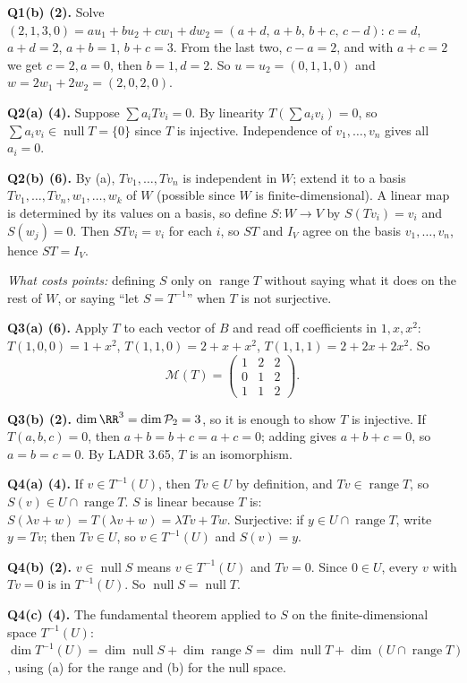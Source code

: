 \documentclass[11pt]{scrartcl}
\DeclareMathOperator{\nul}{null}
\DeclareMathOperator{\range}{range}
\newcommand{\PP}{\mathcal P}
\newcommand{\MM}{\mathcal M}
\begin{document}
\medskip\noindent\textbf{Q1(b) (2).}
Solve $(2,1,3,0)=a u_1+b u_2+c w_1+d w_2=(a+d,\,a+b,\,b+c,\,c-d)$: $c=d$, $a+d=2$, $a+b=1$, $b+c=3$. From the last two, $c-a=2$, and with $a+c=2$ we get $c=2,a=0$, then $b=1,d=2$.
So $u=u_2=(0,1,1,0)$ and $w=2w_1+2w_2=(2,0,2,0)$.

\medskip\noindent\textbf{Q2(a) (4).}
Suppose $\sum a_iTv_i=0$. By linearity $T(\sum a_iv_i)=0$, so $\sum a_iv_i\in\nul T=\{0\}$ since $T$ is injective. Independence of $v_1,\dots,v_n$ gives all $a_i=0$.

\medskip\noindent\textbf{Q2(b) (6).}
By (a), $Tv_1,\dots,Tv_n$ is independent in $W$; extend it to a basis $Tv_1,\dots,Tv_n,w_1,\dots,w_k$ of $W$ (possible since $W$ is finite-dimensional).
A linear map is determined by its values on a basis, so define $S\colon W\to V$ by $S(Tv_i)=v_i$ and $S(w_j)=0$.
Then $STv_i=v_i$ for each $i$, so $ST$ and $I_V$ agree on the basis $v_1,\dots,v_n$, hence $ST=I_V$.

\noindent\textit{What costs points:} defining $S$ only on $\range T$ without saying what it does on the rest of $W$, or saying ``let $S=T^{-1}$'' when $T$ is not surjective.

\medskip\noindent\textbf{Q3(a) (6).}
Apply $T$ to each vector of $B$ and read off coefficients in $1,x,x^2$:
$T(1,0,0)=1+x^2$, $T(1,1,0)=2+x+x^2$, $T(1,1,1)=2+2x+2x^2$. So
\[ \MM(T)=\begin{pmatrix}1&2&2\\0&1&2\\1&1&2\end{pmatrix}. \]

\medskip\noindent\textbf{Q3(b) (2).}
$\dim\RR^3=\dim\PP_2=3$, so it is enough to show $T$ is injective. If $T(a,b,c)=0$, then $a+b=b+c=a+c=0$; adding gives $a+b+c=0$, so $a=b=c=0$. By LADR 3.65, $T$ is an isomorphism.

\medskip\noindent\textbf{Q4(a) (4).}
If $v\in T^{-1}(U)$, then $Tv\in U$ by definition, and $Tv\in\range T$, so $S(v)\in U\cap\range T$.
$S$ is linear because $T$ is: $S(\lambda v+w)=T(\lambda v+w)=\lambda Tv+Tw$.
Surjective: if $y\in U\cap\range T$, write $y=Tv$; then $Tv\in U$, so $v\in T^{-1}(U)$ and $S(v)=y$.

\medskip\noindent\textbf{Q4(b) (2).}
$v\in\nul S$ means $v\in T^{-1}(U)$ and $Tv=0$. Since $0\in U$, every $v$ with $Tv=0$ is in $T^{-1}(U)$. So $\nul S=\nul T$.

\medskip\noindent\textbf{Q4(c) (4).}
The fundamental theorem applied to $S$ on the finite-dimensional space $T^{-1}(U)$:
$\dim T^{-1}(U)=\dim\nul S+\dim\range S=\dim\nul T+\dim(U\cap\range T)$, using (a) for the range and (b) for the null space.
\end{document}
